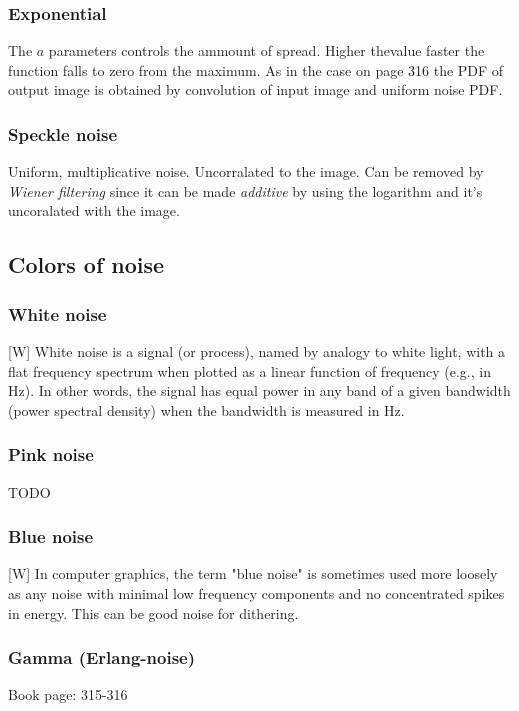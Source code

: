\documentclass[12pt]{article}
\begin{document}
	\subsubsection{Exponential}
    The $a$ parameters controls the ammount of spread. Higher thevalue faster the function falls to zero     from the maximum. As in the case on page 316 the PDF of output image is obtained by convolution of input image     and uniform noise PDF.
	
	\subsubsection{Speckle noise}
	Uniform, multiplicative noise.
	Uncorralated to the image. Can be removed by \textit{Wiener filtering} since it can be made \textit{additive} by using the logarithm and it's uncoralated with the image.

	
	\subsection{Colors of noise}
	\subsubsection{White noise}
	[W] White noise is a signal (or process), named by analogy to white light, with a flat frequency
	spectrum when plotted as a linear function of frequency (e.g., in Hz). In other words, the signal 
	has equal power in any band of a given bandwidth (power spectral density) when the bandwidth is 
	measured in Hz. 
	\subsubsection{Pink noise}
	TODO
	\subsubsection{Blue noise}
	[W] In computer graphics, the term "blue noise" is sometimes used more loosely as any noise with 
	minimal low frequency components and no concentrated spikes in energy. This can be good noise for dithering.
	
	\subsubsection{Gamma (Erlang-noise)}
	Book page: 315-316
	
%	
%	
\end{document}
